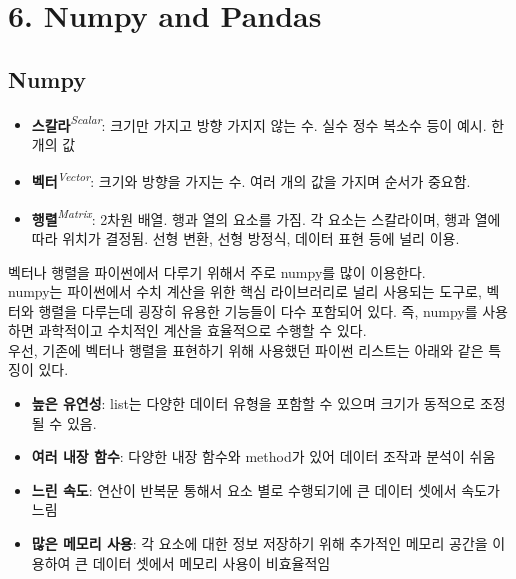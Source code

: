 \section[6. Numpy and Pandas]{6. Numpy and Pandas}

\subsection{Numpy}

\begin{itemize}
\item \textbf{스칼라}\textit{\textsuperscript{Scalar}}: 크기만 가지고 방향 가지지 않는 수. 실수 정수 복소수 등이 예시.
  한 개의 값
\item \textbf{벡터}\textit{\textsuperscript{Vector}}: 크기와 방향을 가지는 수. 여러 개의 값을 가지며 순서가 중요함.
\item \textbf{행렬}\textit{\textsuperscript{Matrix}}: 2차원 배열. 행과 열의 요소를 가짐. 각 요소는 스칼라이며, 행과 열에 따라 위치가 결정됨. 선형 변환, 선형 방정식, 데이터 표현 등에 널리 이용.
\end{itemize}

벡터나 행렬을 파이썬에서 다루기 위해서 주로 numpy를 많이 이용한다.\\
numpy는 파이썬에서 수치 계산을 위한 핵심 라이브러리로 널리 사용되는 도구로, 벡터와 행렬을 다루는데 굉장히 유용한 기능들이 다수 포함되어 있다. 즉, numpy를 사용하면 과학적이고 수치적인 계산을 효율적으로 수행할 수 있다.\\
우선, 기존에 벡터나 행렬을 표현하기 위해 사용했던 파이썬 리스트는 아래와 같은 특징이 있다.
\begin{itemize}
\item \textbf{높은 유연성}: list는 다양한 데이터 유형을 포함할 수 있으며 크기가 동적으로 조정될 수 있음.
\item \textbf{여러 내장 함수}: 다양한 내장 함수와 method가 있어 데이터 조작과 분석이 쉬움
\item \textbf{느린 속도}: 연산이 반복문 통해서 요소 별로 수행되기에 큰 데이터 셋에서 속도가 느림
\item \textbf{많은 메모리 사용}: 각 요소에 대한 정보 저장하기 위해 추가적인 메모리 공간을 이용하여 큰 데이터 셋에서 메모리 사용이 비효율적임
\end{itemize}

